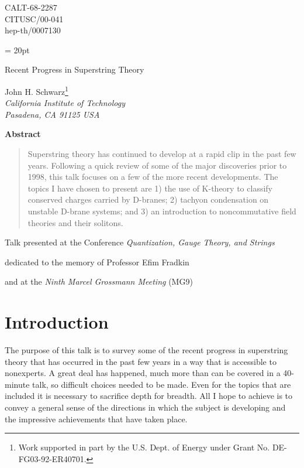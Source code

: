 \documentclass[a4paper,12pt]{article}
\begin{document}
\vspace*{-.6in} \thispagestyle{empty}
\begin{flushright}
CALT-68-2287\\
CITUSC/00-041\\
hep-th/0007130
\end{flushright}
\baselineskip = 20pt

\vspace{.5in} {\Large
\begin{center}
Recent Progress in Superstring Theory\end{center}}

\begin{center}
John H. Schwarz\footnote{Work supported in
part by the U.S. Dept. of Energy under Grant No.
DE-FG03-92-ER40701.}
\\ \emph{California Institute of Technology\\
Pasadena, CA  91125 USA}
\end{center}
\vspace{1in}

\begin{center}
\textbf{Abstract}
\end{center}
\begin{quotation}
\noindent Superstring theory has continued to develop at a rapid
clip in the past few years. Following a quick review of some of
the major discoveries prior to 1998, this talk focuses on a few of
the more recent developments. The topics I have chosen to present
are 1) the use of K-theory to classify conserved charges carried
by D-branes; 2) tachyon condensation on unstable D-brane systems;
and 3) an introduction to noncommutative field theories and their
solitons.
\end{quotation}
\vspace{1in}

\centerline{Talk presented at the Conference {\it Quantization, Gauge Theory, and Strings}}
\centerline{dedicated to the memory of Professor Efim Fradkin}
\centerline{and at the {\it Ninth Marcel Grossmann Meeting} (MG9)} \vfil

\newpage



\section{Introduction}

The purpose of this talk is to survey some of the recent progress
in superstring theory that has occurred in the past few years in a
way that is accessible to nonexperts. A great deal has happened,
much more than can be covered in a 40-minute talk, so difficult
choices needed to be made.  Even for the topics that are included
it is necessary to sacrifice depth for breadth. All I hope to
achieve is to convey a general sense of the directions in which
the subject is developing and the impressive achievements that
have taken place.
\end{document}
